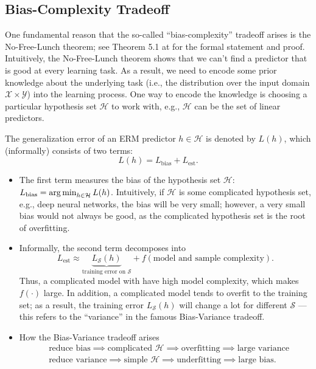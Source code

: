 \subsection{Bias-Complexity Tradeoff}
One fundamental reason that the so-called ``bias-complexity'' tradeoff arises is the No-Free-Lunch theorem; see Theorem 5.1 at \cite{shalev2014understanding} for the formal statement and proof.
Intuitively, the No-Free-Lunch theorem shows that we can't find a predictor that is good at every learning task. 
As a result, we need to encode some prior knowledge about the underlying task (i.e., the distribution over the input domain $\mathcal{X} \times \mathcal{Y}$) into the learning process.
One way to encode the knowledge is choosing a particular hypothesis set $\mathcal{H}$ to work with, e.g., $\mathcal{H}$ can be the set of linear predictors.

The generalization error of an ERM predictor $h \in \mathcal{H}$ is denoted by $L(h)$, which (informally) consists of two terms:
    \begin{equation}
        L(h) = L_\text{bias} + L_\text{est}.
    \end{equation}
\begin{itemize}
    \item The first term measures the bias of the hypothesis set $\mathcal{H}$: $L_\text{bias} = \operatorname{arg\,min}_{h \in \mathcal{H}} L(h)$.
          Intuitively, if $\mathcal{H}$ is some complicated hypothesis set, e.g., deep neural networks, the bias will be very small; however, a very small bias would not always be good, as the complicated hypothesis set is the root of overfitting.
          
    \item Informally, the second term decomposes into
        \begin{equation}
            L_\text{est} \approx \underbrace{L_{\mathcal{S}}(h)}_{\text{training error on $\mathcal{S}$}} + f(\text{model and sample complexity}).
        \end{equation}
    Thus, a complicated model with have high model complexity, which makes $f(\cdot)$ large.
    In addition, a complicated model tends to overfit to the training set; as a result, the training error $L_\mathcal{S}(h)$ will change a lot for different $\mathcal{S}$ --- this refers to the ``variance'' in the famous Bias-Variance tradeoff.
    
    \item How the Bias-Variance tradeoff arises
        \begin{equation}
            \begin{aligned}
                    & \text{reduce bias} \implies \text{complicated $\mathcal{H}$} \implies \text{overfitting} \implies \text{large variance} \\
                    & \text{reduce variance} \implies \text{simple $\mathcal{H}$}   \implies \text{underfitting} \implies \text{large bias}.
            \end{aligned}
        \end{equation}
\end{itemize}


